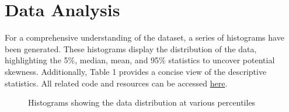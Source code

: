 \documentclass[12pt,a4paper]{article}
\begin{document}
	\section{Data Analysis}
	For a comprehensive understanding of the dataset, a series of histograms have been generated. These histograms display the distribution of the data, highlighting the 5\%, median, mean, and 95\% statistics to uncover potential skewness. Additionally, Table 1 provides a concise view of the descriptive statistics. All related code and resources can be accessed \href{https://github.com/brendondgr/Project-BINF610}{here}.
	\begin{figure}[htbp]
		\begin{center}
		\caption{Histograms showing the data distribution at various percentiles}
		\label{fig:histograms}
		\end{center}
	\end{figure}
\end{document}
